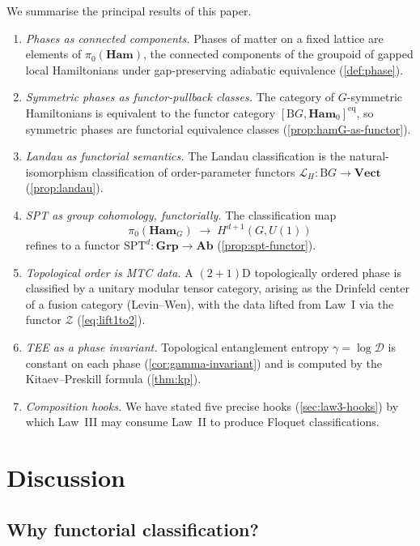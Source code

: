 \documentclass[12pt]{article}
\theoremstyle{plain}
\theoremstyle{definition}
\theoremstyle{remark}
\newcommand{\Ham}{\mathbf{Ham}}
\newcommand{\Vect}{\mathbf{Vect}}
\newcommand{\BG}{\mathrm{B}G}
\begin{document}
We summarise the principal results of this paper.
\begin{enumerate}[label=R\arabic*.,leftmargin=2.4em]
  \item \emph{Phases as connected components.} Phases of matter on a fixed lattice are
    elements of $\pi_{0}(\Ham)$, the connected components of the groupoid of gapped
    local Hamiltonians under gap-preserving adiabatic equivalence
    (\cref{def:phase}).
  \item \emph{Symmetric phases as functor-pullback classes.} The category of $G$-symmetric
    Hamiltonians is equivalent to the functor category $[\BG,\Ham_{0}]^{\mathrm{eq}}$,
    so symmetric phases are functorial equivalence classes
    (\cref{prop:hamG-as-functor}).
  \item \emph{Landau as functorial semantics.} The Landau classification is the
    natural-isomorphism classification of order-parameter functors $\mathcal{L}_{H}:
    \BG\to\Vect$ (\cref{prop:landau}).
  \item \emph{SPT as group cohomology, functorially.} The classification map
    \[
    \pi_{0}(\Ham_{G})\;\to\; H^{d+1}(G,U(1))
    \]
    refines to a functor $\mathrm{SPT}^{d}:\mathbf{Grp}\to\mathbf{Ab}$
    (\cref{prop:spt-functor}).
  \item \emph{Topological order is MTC data.} A $(2{+}1)$D topologically ordered phase is
    classified by a unitary modular tensor category, arising as the Drinfeld center of
    a fusion category (Levin--Wen), with the data lifted from Law~I via the functor
    $\mathcal{Z}$ (\cref{eq:lift1to2}).
  \item \emph{TEE as a phase invariant.} Topological entanglement entropy
    $\gamma=\log\mathcal{D}$ is constant on each phase (\cref{cor:gamma-invariant}) and
    is computed by the Kitaev--Preskill formula (\cref{thm:kp}).
  \item \emph{Composition hooks.} We have stated five precise hooks
    (\cref{sec:law3-hooks}) by which Law~III may consume Law~II to produce Floquet
    classifications.
\end{enumerate}

\section{Discussion}
\label{sec:discussion}

\subsection{Why functorial classification?}
\end{document}
